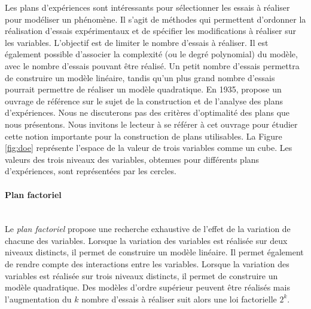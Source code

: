 Les plans d'expériences sont intéressants pour sélectionner les essais à réaliser pour modéliser un phénomène.
Il s'agit de méthodes qui permettent d'ordonner la réalisation d'essais expérimentaux et de spécifier les modifications à réaliser sur les variables.
L'objectif est de limiter le nombre d'essais à réaliser.
Il est également possible d'associer la complexité (ou le degré polynomial) du modèle, avec le nombre d'essais pouvant être réalisé.
Un petit nombre d'essais permettra de construire un modèle linéaire, tandis qu'un plus grand nombre d'essais pourrait permettre de réaliser un modèle quadratique.
En 1935, \citeauthor{fisher_design_1974} \cite{fisher_design_1974} propose un ouvrage de référence sur le sujet de la construction et de l'analyse des plans d'expériences.
Nous ne discuterons pas des critères d'optimalité des plans que nous présentons. Nous invitons le lecteur à se référer à cet ouvrage pour étudier cette notion importante pour la construction de plans utilisables.
La Figure \ref{fig:doe} représente l'espace de la valeur de trois variables comme un cube.
Les valeurs des trois niveaux des variables, obtenues pour différents plans d'expériences, sont représentées par les cercles.

\paragraph{Plan factoriel}\mbox{\label{parag:doe_factorial}} \\
Le \textit{plan factoriel} propose une recherche exhaustive de l'effet de la variation de chacune des variables.
Lorsque la variation des variables est réalisée sur deux niveaux distincts, il permet de construire un modèle linéaire.
Il permet également de rendre compte des interactions entre les variables.
Lorsque la variation des variables est réalisée sur trois niveaux distincts, il permet de construire un modèle quadratique.
Des modèles d'ordre supérieur peuvent être réalisés mais l'augmentation du $k$ nombre d'essais à réaliser suit alors une loi factorielle $2^k$.

